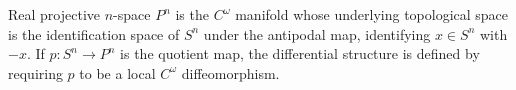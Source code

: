 Real projective $n$-space $P^n$ is the $C^\omega$ manifold whose underlying topological space is the identification space of $S^n$ under the antipodal map, identifying $x \in S^n$ with $-x$. If $p: S^n \to P^n$ is the quotient map, the differential structure is defined by requiring $p$ to be a local $C^\omega$ diffeomorphism.
